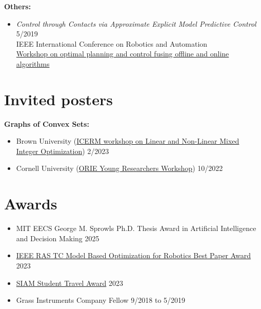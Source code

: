 \documentclass[11pt,a4paper,sans]{moderncv}
\begin{document}
\textbf{Others:}

\begin{itemize}

\item \textit{Control through Contacts via Approximate Explicit Model Predictive Control} \hfill 5/2019 \\
IEEE International Conference on Robotics and Automation \\
\href{https://sites.google.com/mit.edu/icra19ws/speakers?authuser=0}{\color{cyan}Workshop  on optimal planning and control fusing offline and online algorithms}

\end{itemize}

\section{Invited posters}

\textbf{Graphs of Convex Sets:}

\begin{itemize}

\item
Brown University
(\href{https://icerm.brown.edu/programs/sp-s23/w1/}{\color{cyan}ICERM workshop on Linear and Non-Linear Mixed Integer Optimization})
\hfill 2/2023

\item
Cornell University
(\href{https://www.orie.cornell.edu/orie-events/young-researchers-workshop}{\color{cyan}ORIE Young Researchers Workshop})
\hfill 10/2022

\end{itemize}

\section{Awards}


\begin{itemize}
\item 
MIT EECS George M. Sprowls Ph.D. Thesis Award in Artificial Intelligence and Decision Making \hfill 2025
\item \href{https://www.tcoptrob.org/news/2024-06-12-best-paper/}{\color{cyan}IEEE RAS TC Model Based Optimization for Robotics Best Paper Award} \hfill 2023
\item  \href{https://www.siam.org/conferences/conference-support/siam-student-travel-awards}{\color{cyan}SIAM Student Travel Award} \hfill 2023
\item Grass Instruments Company Fellow \hfill 9/2018 to 5/2019
\end{itemize}
\end{document}
